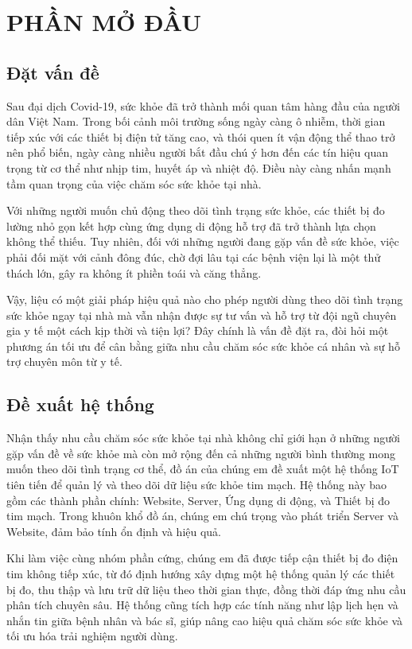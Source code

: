 
\section*{PHẦN MỞ ĐẦU}
\subsection*{Đặt vấn đề} 

Sau đại dịch Covid-19, sức khỏe đã trở thành mối quan tâm hàng đầu của người dân Việt Nam. Trong bối cảnh môi trường sống ngày càng ô nhiễm, thời gian tiếp xúc với các thiết bị điện tử tăng cao, và thói quen ít vận động thể thao trở nên phổ biến, ngày càng nhiều người bắt đầu chú ý hơn đến các tín hiệu quan trọng từ cơ thể như nhịp tim, huyết áp và nhiệt độ. Điều này càng nhấn mạnh tầm quan trọng của việc chăm sóc sức khỏe tại nhà.

Với những người muốn chủ động theo dõi tình trạng sức khỏe, các thiết bị đo lường nhỏ gọn kết hợp cùng ứng dụng di động hỗ trợ đã trở thành lựa chọn không thể thiếu. Tuy nhiên, đối với những người đang gặp vấn đề sức khỏe, việc phải đối mặt với cảnh đông đúc, chờ đợi lâu tại các bệnh viện lại là một thử thách lớn, gây ra không ít phiền toái và căng thẳng.

Vậy, liệu có một giải pháp hiệu quả nào cho phép người dùng theo dõi tình trạng sức khỏe ngay tại nhà mà vẫn nhận được sự tư vấn và hỗ trợ từ đội ngũ chuyên gia y tế một cách kịp thời và tiện lợi? Đây chính là vấn đề đặt ra, đòi hỏi một phương án tối ưu để cân bằng giữa nhu cầu chăm sóc sức khỏe cá nhân và sự hỗ trợ chuyên môn từ y tế.

\subsection*{Đề xuất hệ thống}


Nhận thấy nhu cầu chăm sóc sức khỏe tại nhà không chỉ giới hạn ở những người gặp vấn đề về sức khỏe mà còn mở rộng đến cả những người bình thường mong muốn theo dõi tình trạng cơ thể, đồ án của chúng em đề xuất một hệ thống IoT tiên tiến để quản lý và theo dõi dữ liệu sức khỏe tim mạch. Hệ thống này bao gồm các thành phần chính: Website, Server, Ứng dụng di động, và Thiết bị đo tim mạch.
Trong khuôn khổ đồ án, chúng em chú trọng vào phát triển Server và Website, đảm bảo tính ổn định và hiệu quả.

Khi làm việc cùng nhóm phần cứng, chúng em đã được tiếp cận thiết bị đo điện tim không tiếp xúc, từ đó định hướng xây dựng một hệ thống quản lý các thiết bị đo, thu thập và lưu trữ dữ liệu theo thời gian thực, đồng thời đáp ứng nhu cầu phân tích chuyên sâu. Hệ thống cũng tích hợp các tính năng như lập lịch hẹn và nhắn tin giữa bệnh nhân và bác sĩ, giúp nâng cao hiệu quả chăm sóc sức khỏe và tối ưu hóa trải nghiệm người dùng.

